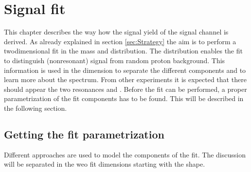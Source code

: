 \chapter{Signal fit}
\label{sec:Signalfit}
This chapter describes the way how the signal yield \NLc of the signal channel \LbToDpmunuX is derived.
As already explained in section \ref{sec:Strategy} the aim is to perform a twodimensional fit in the \Dz\proton mass and \logIP distribution.
The \logIP distribution enables the fit to distinguish (nonresonant) signal from random proton background.
This information is used in the \MDp dimension to separate the different components and to learn more about the \MDp spectrum.
From other experiments it is expected that there should appear the two resonances \decay{\LcResI}{\Dz\proton} and \decay{\LcResII}{\Dz\proton} \cite{BaBar_D0p}.
Before the fit can be performed, a proper parametrization of the fit components has to be found. 
This will be described in the following section.

\section{Getting the fit parametrization}
Different approaches are used to model the components of the fit. 
The discussion will be separated in the weo fit dimensions starting with the \logIP shape.

